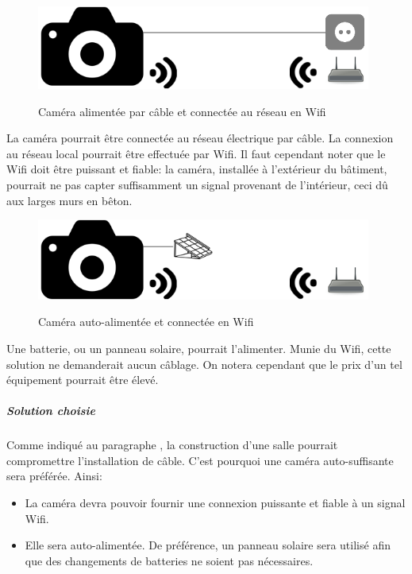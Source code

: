 \begin{figure}[H]
    \includegraphics[width=110mm]{img/conception/cam_con_3.png}
    \label{fig:cam_connection_3}
    \centering
    \caption{Caméra alimentée par câble et connectée au réseau en Wifi}
\end{figure}

La caméra pourrait être connectée au réseau électrique par câble. La connexion au réseau local pourrait être effectuée par Wifi. Il faut cependant noter que le Wifi doit être puissant et fiable: la caméra, installée à l'extérieur du bâtiment, pourrait ne pas capter suffisamment un signal provenant de l'intérieur, ceci dû aux larges murs en bêton. 

\begin{figure}[H]
    \includegraphics[width=110mm]{img/conception/cam_con_4.png}
    \label{fig:cam_connection_4}
    \centering
    \caption{Caméra auto-alimentée et connectée en Wifi}
\end{figure}

Une batterie, ou un panneau solaire, pourrait l'alimenter. Munie du Wifi, cette solution ne demanderait aucun câblage. On notera cependant que le prix d'un tel équipement pourrait être élevé.

\subparagraph{Solution choisie}

Comme indiqué au paragraphe , la construction d'une salle pourrait compromettre l'installation de câble. C'est pourquoi une caméra auto-suffisante sera préférée. Ainsi:
\begin{itemize}
    \item La caméra devra pouvoir fournir une connexion puissante et fiable à un signal Wifi.
    \item Elle sera auto-alimentée. De préférence, un panneau solaire sera utilisé afin que des changements de batteries ne soient pas nécessaires.
\end{itemize}

